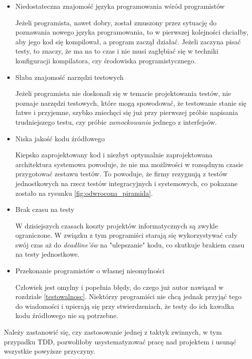 \begin{itemize}
\item
Niedostateczna znajomość języka programowania wśród programistów

Jeżeli programista, nawet dobry, został zmuszony przez sytuację do poznawania nowego języka programowania, to w pierwszej kolejności chciałby, aby jego kod się kompilował, a program zaczął działać. Jeżeli zaczyna pisać testy, to znaczy, że ma na to czas i nie musi zagłębiać się w techniki konfiguracji kompilatora, czy środowiska programistycznego. 

\item
Słaba znajomość narzędzi testowych

Jeżeli programista nie doskonali się w temacie projektowania testów, nie poznaje narzędzi testowych, które mogą spowodować, że testowanie stanie się łatwe i przyjemne, szybko zniechęci się już przy pierwszej próbie napisania trudniejszego testu, czy próbie \textit{zamockowania} jednego z interfejsów.

\item
Niska jakość kodu źródłowego

Kiepsko zaprojektowany kod i niezbyt optymalnie zaprojektowana architektura systemowa powoduje, że nie ma możliwości w rozsądnym czasie przygotować zestawu testów. To powoduje, że firmy rezygnują z  testów jednostkowych na rzecz testów integracyjnych i systemowych, co pokazane zostało na rysunku \ref{fig:odwrocona_piramida}.

\item
Brak czasu na testy

W dzisiejszych czasach koszty projektów informatycznych są zwykle ograniczone. W związku z tym programiści starają się wykorzystywać cały swój czas aż do \textit{deadline'ów} na "ulepszanie" kodu, co skutkuje brakiem czasu na testy jednostkowe.

\item
Przekonanie programistów o własnej nieomylności

Człowiek jest omylny i popełnia błędy, do czego już autor nawiązał w rozdziale \ref{testowalnosc}. Niektórzy programiści nie chcą jednak przyjąć tego do wiadomości i upierają się przy stwierdzeniach, że testy do ich kawałka kodu źródłowego nie są potrzebne.
\end{itemize}

Należy zastanowić się, czy zastosowanie jednej z taktyk zwinnych, w tym przypadku TDD, pozwoliłoby usystematyzować pracę nad projektem i usunąć wszystkie powyższe przyczyny.

